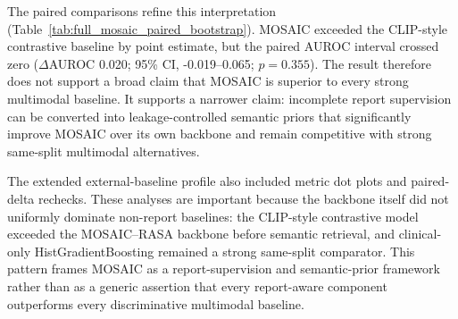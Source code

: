 The paired comparisons refine this interpretation (Table~\ref{tab:full_mosaic_paired_bootstrap}). MOSAIC exceeded the CLIP-style contrastive baseline by point estimate, but the paired AUROC interval crossed zero (\(\Delta\)AUROC 0.020; 95\% CI, -0.019--0.065; \(p=0.355\)). The result therefore does not support a broad claim that MOSAIC is superior to every strong multimodal baseline. It supports a narrower claim: incomplete report supervision can be converted into leakage-controlled semantic priors that significantly improve MOSAIC over its own backbone and remain competitive with strong same-split multimodal alternatives.

The extended external-baseline profile also included metric dot plots and paired-delta rechecks. These analyses are important because the backbone itself did not uniformly dominate non-report baselines: the CLIP-style contrastive model exceeded the MOSAIC--RASA backbone before semantic retrieval, and clinical-only HistGradientBoosting remained a strong same-split comparator. This pattern frames MOSAIC as a report-supervision and semantic-prior framework rather than as a generic assertion that every report-aware component outperforms every discriminative multimodal baseline.

